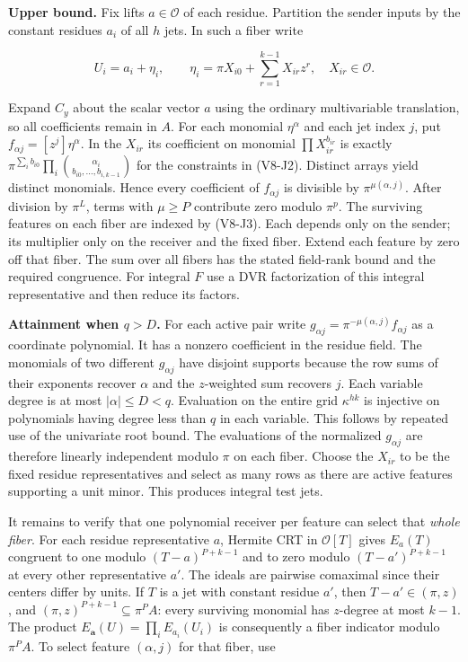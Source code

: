 \documentclass[
  11pt,
]{article}
\begin{document}
\textbf{Upper bound.} Fix lifts \(a\in\mathcal O\) of each residue.
Partition the sender inputs by the constant residues \(a_i\) of all
\(h\) jets. In such a fiber write

\[
     U_i=a_i+\eta_i,\qquad
     \eta_i=\pi X_{i0}+\sum_{r=1}^{k-1}X_{ir}z^r,\quad X_{ir}\in\mathcal O.
\]

Expand \(C_y\) about the scalar vector \(a\) using the ordinary
multivariable translation, so all coefficients remain in \(A\). For each
monomial \(\eta^\alpha\) and each jet index \(j\), put
\(f_{\alpha j}=[z^j]\eta^\alpha\). In the \(X_{ir}\) its coefficient on
monomial \(\prod X_{ir}^{b_{ir}}\) is exactly
\(\pi^{\sum_i b_{i0}}\prod_i{\alpha_i\choose b_{i0},\ldots,b_{i,k-1}}\)
for the constraints in (V8-J2). Distinct arrays yield distinct monomials.
Hence every coefficient of \(f_{\alpha j}\) is divisible by
\(\pi^{\mu(\alpha,j)}\). After division by \(\pi^L\), terms with
\(\mu\ge P\) contribute zero modulo \(\pi^p\). The surviving features on
each fiber are indexed by (V8-J3). Each depends only on the sender; its
multiplier only on the receiver and the fixed fiber. Extend each feature
by zero off that fiber. The sum over all fibers has the stated
field-rank bound and the required congruence. For integral \(F\) use a
DVR factorization of this integral representative and then reduce its
factors.

\textbf{Attainment when \(q>D\).} For each active pair write
\(g_{\alpha j}=\pi^{-\mu(\alpha,j)} f_{\alpha j}\) as a coordinate
polynomial. It has a nonzero coefficient in the residue field. The
monomials of two different \(g_{\alpha j}\) have disjoint supports
because the row sums of their exponents recover \(\alpha\) and the
\(z\)-weighted sum recovers \(j\). Each variable degree is at most
\(|\alpha|\le D<q\). Evaluation on the entire grid \(\kappa^{hk}\) is
injective on polynomials having degree less than \(q\) in each variable.
This follows by repeated use of the univariate root bound. The
evaluations of the normalized \(g_{\alpha j}\) are therefore linearly
independent modulo \(\pi\) on each fiber. Choose the \(X_{ir}\) to be
the fixed residue representatives and select as many rows as there are
active features supporting a unit minor. This produces integral test
jets.

It remains to verify that one polynomial receiver per feature can select
that \emph{whole fiber}. For each residue representative \(a\), Hermite
CRT in \(\mathcal O[T]\) gives \(E_a(T)\) congruent to one modulo
\((T-a)^{P+k-1}\) and to zero modulo \((T-a')^{P+k-1}\) at every other
representative \(a'\). The ideals are pairwise comaximal since their
centers differ by units. If \(T\) is a jet with constant residue \(a'\),
then \(T-a'\in(\pi,z)\), and \((\pi,z)^{P+k-1}\subseteq\pi^P A\): every
surviving monomial has \(z\)-degree at most \(k-1\). The product
\(E_{\boldsymbol a}(U)=\prod_i E_{a_i}(U_i)\) is consequently a fiber
indicator modulo \(\pi^P A\). To select feature \((\alpha,j)\) for that
fiber, use
\end{document}
